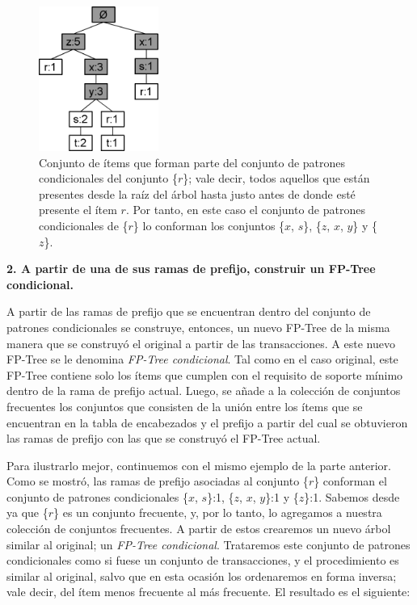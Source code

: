 \begin{figure}[h!]
\begin{center}
\includegraphics[width=0.35\textwidth]{imagenes/cond_pat.png}
\end{center}
\vspace*{-5mm}
\caption{Conjunto de ítems que forman parte del conjunto de patrones condicionales del conjunto \{$r$\}; vale decir, todos aquellos que están presentes desde la raíz del árbol hasta justo antes de donde esté presente el ítem $r$. Por tanto, en este caso el conjunto de patrones condicionales de \{$r$\} lo conforman los conjuntos \{$x$, $s$\}, \{$z$, $x$, $y$\} y \{$z$\}.}
\label{fig:cond_pat}
\end{figure}

\textbf{2. A partir de una de sus ramas de prefijo, construir un FP-Tree condicional.}

A partir de las ramas de prefijo que se encuentran dentro del conjunto de patrones condicionales se construye, entonces, un nuevo FP-Tree de la misma manera que se construyó el original a partir de las transacciones. A este nuevo FP-Tree se le denomina \textit{FP-Tree condicional}. Tal como en el caso original, este FP-Tree contiene solo los ítems que cumplen con el requisito de soporte mínimo dentro de la rama de prefijo actual. Luego, se añade a la colección de conjuntos frecuentes los conjuntos que consisten de la unión entre los ítems que se encuentran en la tabla de encabezados y el prefijo a partir del cual se obtuvieron las ramas de prefijo con las que se construyó el FP-Tree actual.

Para ilustrarlo mejor, continuemos con el mismo ejemplo de la parte anterior. Como se mostró, las ramas de prefijo asociadas al conjunto \{$r$\} conforman el conjunto de patrones condicionales \{$x$, $s$\}:1, \{$z$, $x$, $y$\}:1 y \{$z$\}:1. Sabemos desde ya que \{$r$\} es un conjunto frecuente, y, por lo tanto, lo agregamos a nuestra colección de conjuntos frecuentes. A partir de estos crearemos un nuevo árbol similar al original; un \textit{FP-Tree condicional}. Trataremos este conjunto de patrones condicionales como si fuese un conjunto de transacciones, y el procedimiento es similar al original, salvo que en esta ocasión los ordenaremos en forma inversa; vale decir, del ítem menos frecuente al más frecuente. El resultado es el siguiente:

